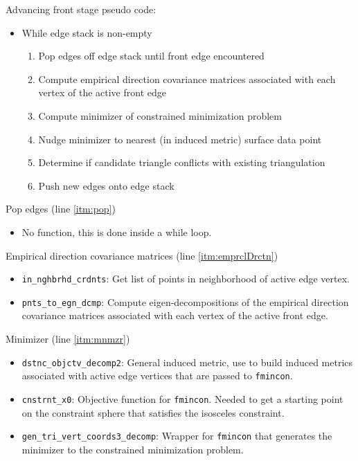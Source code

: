 \documentclass[11pt]{amsart}
\begin{document}
\noindent
Advancing front stage pseudo code:
\begin{itemize}
\item
While edge stack is non-empty
\begin{enumerate}
\item 
Pop edges off edge stack until front edge encountered
\label{itm:pop}
\item 
Compute empirical direction covariance matrices associated with each vertex of the active front edge
\label{itm:emprclDrctn}
\item 
Compute minimizer of constrained minimization problem
\label{itm:mnmzr}
\item 
Nudge minimizer to nearest (in induced metric) surface data point
\label{itm:nudge}
\item 
Determine if candidate triangle conflicts with existing triangulation
\label{itm:cnflct}
\item 
Push new edges onto edge stack
\label{itm:pushNewEdgs}
\end{enumerate}
\end{itemize}

\noindent
Pop edges (line \ref{itm:pop})
\begin{itemize}
\item
No function, this is done inside a while loop.
\end{itemize}

\noindent
Empirical direction covariance matrices (line \ref{itm:emprclDrctn})
\begin{itemize}
\item
\verb+in_nghbrhd_crdnts+: Get list of points in neighborhood of active edge vertex.
\item
\verb+pnts_to_egn_dcmp+: Compute eigen-decompositions of the empirical direction covariance matrices associated with each vertex of the active front edge.
\end{itemize}

\noindent
Minimizer (line \ref{itm:mnmzr})
\begin{itemize}
\item
\verb+dstnc_objctv_decomp2+: General induced metric, use to build induced metrics associated with active edge vertices that are passed to \verb+fmincon+.
\item
\verb+cnstrnt_x0+: Objective function for \verb+fmincon+. Needed to get a starting point on the constraint sphere that satisfies the isosceles constraint.
\item 
\verb+gen_tri_vert_coords3_decomp+: Wrapper for \verb+fmincon+ that generates the minimizer to the constrained minimization problem.
\end{itemize}
\end{document}

